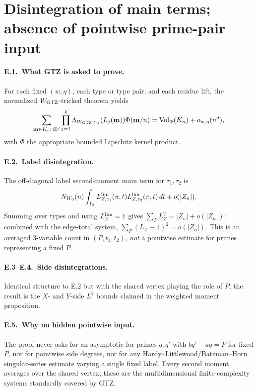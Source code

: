 \documentclass[11pt]{article}
\begin{document}
\section{Disintegration of main terms; absence of pointwise prime-pair input}

\paragraph{E.1.\ What GTZ is asked to prove.}
For each fixed \((w,\eta)\), each type or type pair, and each residue lift,
the normalized \(W_{\rm GTZ}\)-tricked theorem yields
\[
  \sum_{\mathbf m\in K_n\cap\mathbb Z^d}
    \prod_{j=1}^k \Lambda_{W_{\rm GTZ},\alpha_j}(L_j(\mathbf m))
    \Phi(\mathbf m/n)
  =\operatorname{Vol}_\Phi(K_n)+o_{w,\eta}(n^d),
\]
with \(\Phi\) the appropriate bounded Lipschitz kernel product.

\paragraph{E.2.\ Label disintegration.}
The off-diagonal label second-moment main term for \(\tau_1,\tau_2\) is
\[
  N_{W_0}(n)\int_{I_\beta}
    L_{Z,\tau_1}^{\rm lim}(\pi,t)L_{Z,\tau_2}^{\rm lim}(\pi,t)\,dt
  +o(|Z_n|).
\]
Summing over types and using \(L_Z^{\rm lim}=1\) gives
\(\sum_P L_Z^2=|Z_n|+o(|Z_n|)\); combined with the edge-total system,
\(\sum_P(L_Z-1)^2=o(|Z_n|)\).  This is an averaged 3-variable count in
\((P,t_1,t_2)\), \emph{not} a pointwise estimate for primes representing a
fixed \(P\).

\paragraph{E.3--E.4.\ Side disintegrations.}
Identical structure to E.2 but with the shared vertex playing the role of
\(P\); the result is the \(X\)- and \(Y\)-side \(L^2\) bounds claimed in the
weighted moment proposition.

\paragraph{E.5.\ Why no hidden pointwise input.}
The proof never asks for an asymptotic for primes \(q,q'\) with
\(bq'-aq=P\) for fixed \(P\), nor for pointwise side degrees, nor for any
Hardy--Littlewood/Bateman--Horn singular-series estimate varying a single
fixed label.  Every second moment averages over the shared vertex; these are
the multidimensional finite-complexity systems standardly covered by GTZ.
\end{document}
